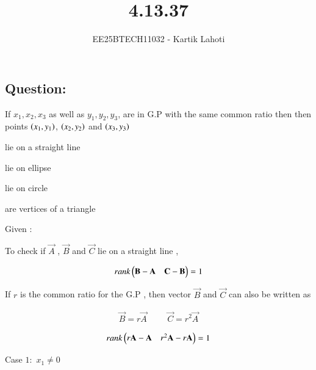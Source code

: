 \documentclass[journal]{IEEEtran}
\numberwithin{equation}{enumi}
\numberwithin{figure}{enumi}
\begin{document}

\vspace{3cm}

\title{4.13.37}
\author{EE25BTECH11032 - Kartik Lahoti}
\maketitle

\subsection*{Question: } 
If $x_1 , x_2 , x_3$ as well as $y_1 , y_2 ,y _3$, are in G.P with the same common ratio then then points $\left(x_1 , y_1\right)$, $\left(x_2 , y_2\right)$ and $\left(x_3 , y_3\right)$

\begin{enumerate}
    \begin{multicols}{2}
        \item lie on a straight line
        \item lie on ellipse 
        \item lie on circle
        \item are vertices of a triangle
    \end{multicols}
\end{enumerate}

\solution 

Given : 
\begin{table}[H]
    \centering
    
    \caption*{}
    \label{tab:placeholder_1}
\end{table}

To check if $\vec{A}$ , $\vec{B}$ and $\vec{C}$ lie on a straight line , 

\begin{align}
    rank\begin{pmatrix}\mathbf{B} - \mathbf{A} & \mathbf{C} - \mathbf{B}\end{pmatrix} = 1
\end{align}

If $r$ is the common ratio for the G.P , then vector $\vec{B}$ and $\vec{C}$ can also be written as

\begin{align}
    \vec{B} = r\vec{A} \hspace{1cm} \vec{C} = r^2\vec{A} 
\end{align}

\begin{align}
    rank\begin{pmatrix}r\mathbf{A} - \mathbf{A} & r^2\mathbf{A} - r\mathbf{A} \end{pmatrix} = 1 
\end{align}

Case $1\colon$ $x_1 \neq 0 $ 
\end{document}
